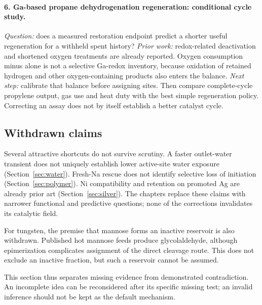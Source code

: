 \paragraph{6. Ga-based propane dehydrogenation regeneration: conditional cycle study.}
\emph{Question:} does a measured restoration endpoint predict a shorter useful regeneration for a withheld spent history? \emph{Prior work:} redox-related deactivation and shortened oxygen treatments are already reported.\citep{wu2025,buchbinder2022} Oxygen consumption minus \COtwo{} alone is not a selective Ga-redox inventory, because oxidation of retained hydrogen and other oxygen-containing products also enters the balance. \emph{Next step:} calibrate that balance before assigning sites. Then compare complete-cycle propylene output, gas use and heat duty with the best simple regeneration policy. Correcting an assay does not by itself establish a better catalyst cycle.

\subsection*{Withdrawn claims}

Several attractive shortcuts do not survive scrutiny. A faster outlet-water transient does not uniquely establish lower active-site water exposure (Section~\ref{sec:water}). Fresh-Na rescue does not identify selective loss of initiation (Section~\ref{sec:polymer}). Ni compatibility and retention on promoted Ag are already prior art (Section~\ref{sec:silver}). The chapters replace these claims with narrower functional and predictive questions; none of the corrections invalidates its catalytic field.

For tungsten, the premise that mannose forms an inactive reservoir is also withdrawn. Published hot mannose feeds produce glycolaldehyde, although epimerization complicates assignment of the direct cleavage route.\citep{elmohammad2024} This does not exclude an inactive fraction, but such a reservoir cannot be assumed.

This section thus separates missing evidence from demonstrated contradiction. An incomplete idea can be reconsidered after its specific missing test; an invalid inference should not be kept as the default mechanism.
